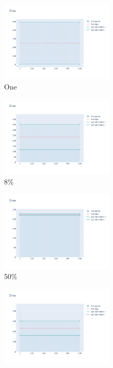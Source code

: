 \documentclass[12pt, fleqn]{report}                             %
\theoremstyle{break}                                            %
\begin{document}
      \begin{figure}[ht!]
        \centering
        \begin{subfigure}[b]{0.4\linewidth}
          \includegraphics[width=0.6\textwidth]{Images/25/dia-a.png}
          \caption{One}
        \end{subfigure}
        \begin{subfigure}[b]{0.4\linewidth}
          \includegraphics[width=0.6\textwidth]{Images/25/dia-b.png}
          \caption{8\%}
        \end{subfigure}
        \begin{subfigure}[b]{0.4\linewidth}
          \includegraphics[width=0.6\textwidth]{Images/25/dia-c.png}
          \caption{50\%}
        \end{subfigure}
        \begin{subfigure}[b]{0.4\linewidth}
          \includegraphics[width=0.6\textwidth]{Images/25/dia-d.png}

\end{subfigure}
\end{figure}
\end{document}
